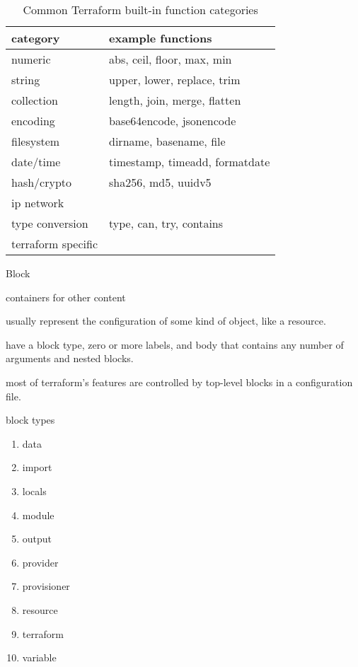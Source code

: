 \documentclass[openany, 12pt]{book}
\begin{document}
\begin{table}[h!]
	\centering
	\begin{tabular}{ll}
		\toprule
		category           & example functions              \\
		\midrule
		numeric            & abs, ceil, floor, max, min     \\
		string             & upper, lower, replace, trim    \\
		collection         & length, join, merge, flatten   \\
		encoding           & base64encode, jsonencode       \\
		filesystem         & dirname, basename, file        \\
		date/time          & timestamp, timeadd, formatdate \\
		hash/crypto        & sha256, md5, uuidv5            \\
		ip network         &                                \\
		type conversion    & type, can, try, contains       \\
		terraform specific &                                \\
		\bottomrule
	\end{tabular}
	\caption{Common Terraform built-in function categories}
\end{table}

\begin{definition}{Block}{}
	\begin{alist}
		\item containers for other content
		\item usually represent the configuration of some kind of object, like a
		resource.
		\item have a block type, zero or more labels, and body
		that contains any number of arguments and nested blocks.
		\item most of terraform's features are controlled by top-level blocks in
		a configuration file.
	\end{alist}

	block types
	\begin{multicols}{4}
		\begin{enumerate}[label = {(\arabic*)}]
			\item data
			\item import
			\item locals
			\item module
			\item output
			\item provider
			\item provisioner
			\item resource
			\item terraform
			\item variable
		\end{enumerate}
	\end{multicols}
\end{definition}
\end{document}

